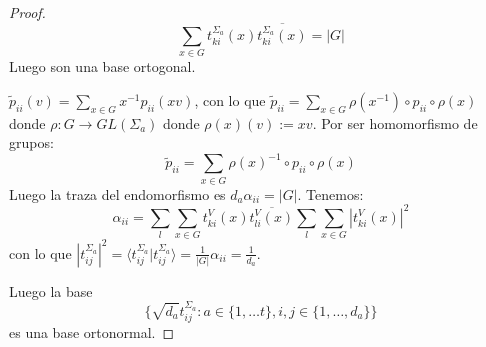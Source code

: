 \begin{proof}
  \[
    \sum_{x\in G} t_{ki}^{\Sigma_a}(x)\overline{t_{ki}^{\Sigma_a}(x)}=
    |G|
  \]
  Luego son una base ortogonal.

  \(\tilde{p}_{ii}(v) = \sum_{x\in G} x^{-1} p_{ii}(xv)\),
   con lo que \(\tilde{p}_{ii}
   =\sum_{x\in G}\rho(x^{-1})\circ p_{ii}\circ\rho(x)\)
   donde \(\rho:G\longrightarrow GL(\Sigma_a)\) donde \(\rho(x)(v):=xv\).
   Por ser homomorfismo de grupos:
  \[
    \tilde{p}_{ii} =\sum_{x\in G}{\rho(x)}^{-1}\circ p_{ii}\circ\rho(x)
  \]
  Luego la traza del endomorfismo es
  \(d_a \alpha_{ii} = |G|\). Tenemos:
  \[
    \alpha_{ii}  =
    \sum_l\sum_{x\in G} t^V_{ki}(x) \overline{t_{li}^V(x)}
    \sum_l\sum_{x\in G} |t^V_{ki}(x)|^2
  \]
  con lo que \(|t_{ij}^{\Sigma_a}|^2=
  \langle t_{ij}^{\Sigma_a}| t_{ij}^{\Sigma_a}\rangle
  =\frac{1}{|G|}\alpha_{ii}=\frac{1}{d_a}\).

  Luego la base
  \[
    \{\sqrt{d_a}t_{ij}^{\Sigma_a}:
    a\in \{1,\ldots t\}, i,j\in\{1,\ldots, d_a\}\}
  \]
  es una base ortonormal.

\end{proof}

